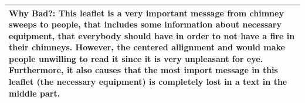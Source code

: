\documentclass[a4paper,11pt,oneside]{scrreprt}
\begin{document}
\begin{tabularx}{\textwidth}{|X|}
	\\
	\textbf{Why Bad?:} This leaflet is a very important message from chimney sweeps to people, that includes some information about necessary equipment, that everybody should have in order to not have a fire in their chimneys. However, the centered allignment and would make people unwilling to read it since it is very unpleasant for eye. Furthermore, it also causes that the most import message in this leaflet (the necessary equipment) is completely lost in a text in the middle part.
	
	\\
	\hline	
	
	
	
	
\end{tabularx}\\

\end{document}
